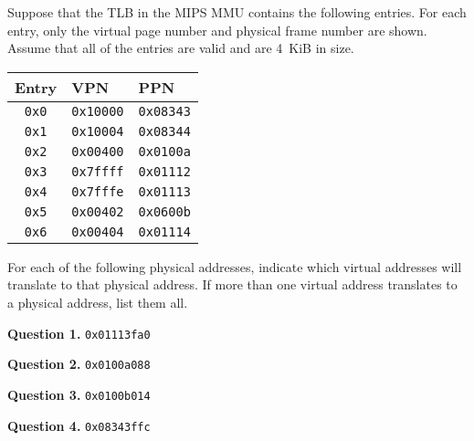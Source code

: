 \documentclass[letterpaper,twocolumn,10pt]{article}
\begin{document}
Suppose that the TLB in the MIPS MMU contains the following entries.  For each 
entry, only the virtual page number and physical frame number are shown.  
Assume that all of the entries are valid and are 4~KiB in size.

\begin{table}[h!]
\centering
\begin{tabular}{c|l|l}
\toprule
Entry & VPN & PPN \\
\midrule
    {\tt 0x0}  & {\tt 0x10000}  & {\tt 0x08343} \\
    {\tt 0x1}  & {\tt 0x10004}  & {\tt 0x08344} \\
    {\tt 0x2}  & {\tt 0x00400}  & {\tt 0x0100a} \\
    {\tt 0x3}  & {\tt 0x7ffff}  & {\tt 0x01112} \\
    {\tt 0x4}  & {\tt 0x7fffe}  & {\tt 0x01113} \\
    {\tt 0x5}  & {\tt 0x00402}  & {\tt 0x0600b} \\
    {\tt 0x6}  & {\tt 0x00404}  & {\tt 0x01114} \\
\bottomrule
\end{tabular}
\end{table}

For each of the following physical addresses, indicate which virtual addresses 
will translate to that physical address.  If more than one virtual address 
translates to a physical address, list them all.

\vspace{1em}

\noindent
\textbf{Question 1.} {\tt 0x01113fa0}

\vspace{16em}

\noindent
\textbf{Question 2.} {\tt 0x0100a088}

\vspace{16em}
\break

\textbf{Question 3.} {\tt 0x0100b014}

\vspace{16em}

\textbf{Question 4.} {\tt 0x08343ffc}
\end{document}
